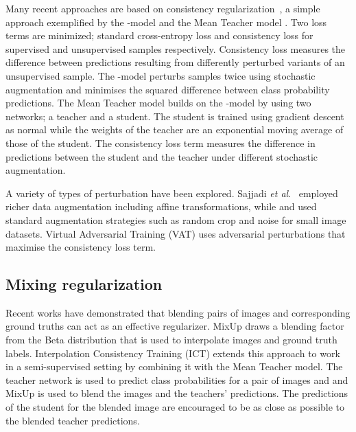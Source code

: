 \documentclass{article}
\newcommand{\etal}{\textit{et al}.}
\begin{document}
Many recent approaches are based on 
consistency regularization~\cite{Oliver:RealisticEval}, a simple approach exemplified by
the -model \cite{Laine:Temporal} and the Mean Teacher model \cite{Tarvainen:MeanTeachers}.
Two loss terms are minimized; standard
cross-entropy loss and consistency loss for supervised and unsupervised samples
respectively. Consistency loss measures the difference between predictions resulting
from differently perturbed variants of an unsupervised sample.
The -model perturbs samples twice using stochastic augmentation and
minimises the squared difference between class probability predictions. The Mean
Teacher model builds on the -model by using two networks; a teacher and a student.
The student is trained using gradient descent as normal while the weights of the teacher
are an exponential moving average of those of the student. The consistency loss term
measures the difference in predictions between the student and the teacher
under different stochastic augmentation.

A variety of types of perturbation have been explored. Sajjadi \etal~\cite{Sajjadi:RegPertSemiSup} employed
richer data augmentation including affine transformations,
while \cite{Laine:Temporal} and \cite{Tarvainen:MeanTeachers} used standard augmentation strategies
such as random crop and noise for small image datasets.
Virtual Adversarial Training (VAT) uses adversarial perturbations that
maximise the consistency loss term.





































\subsection{Mixing regularization}

Recent works have demonstrated that blending pairs of images and corresponding ground truths
can act as an effective regularizer. MixUp \cite{Zhang:MixUp} draws a blending
factor from the Beta distribution that is used to interpolate images and ground truth labels.
Interpolation Consistency Training (ICT) \cite{Verma:ICT} extends this approach to work in a
semi-supervised setting by combining it with the Mean Teacher model. The teacher network
is used to predict class probabilities for a pair of images  and  and MixUp is used to
blend the images and the teachers' predictions. The predictions of the student for the blended
image are encouraged to be as close as possible to the blended teacher predictions.
\end{document}
